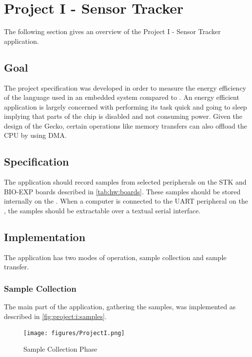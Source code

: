 \section{Project I - Sensor Tracker}
\label{sec:impl:project:i}

The following section gives an overview of the Project I - Sensor Tracker application.

\subsection{Goal}
The project specification was developed in order to measure the energy efficiency of the {\rust} language used in an embedded system compared to {\C}.
An energy efficient application is largely concerned with performing its task quick and going to sleep implying that parts of the chip is disabled and not consuming power.
Given the design of the Gecko, certain operations like memory transfers can also offload the CPU by using DMA.


\subsection{Specification}

The application should record samples from selected peripherals on the STK and BIO-EXP boards described in \autoref{tab:hw:boards}.
These samples should be stored internally on the {\gecko}.
When a computer is connected to the UART peripheral on the {\gecko}, the samples should be extractable over a textual serial interface.

\subsection{Implementation}

The application has two modes of operation, sample collection and sample transfer.

\subsubsection{Sample Collection}

The main part of the application, gathering the samples, was implemented as described in \autoref{fig:project:i:samples}.

\begin{figure}[H]
  \begin{center}
    \texttt{[image: figures/ProjectI.png]}
  \end{center}
  \caption{Sample Collection Phase}
  \label{fig:project:i:samples}
\end{figure}


